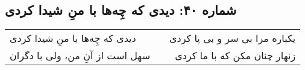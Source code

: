 \begin{center}
\section*{شماره ۴۰: دیدی که چِه‌ها با منِ شیدا کردی}
\label{sec:040}
\begin{longtable}{l p{0.5cm} r}
دیدی که چِه‌ها با منِ شیدا کردی
&&
یکباره مرا بی سر و بی پا کردی
\\
سهل است از آنِ من، ولی با دگران
&&
زنهار چنان مکن که با ما کردی
\\
\end{longtable}
\end{center}
